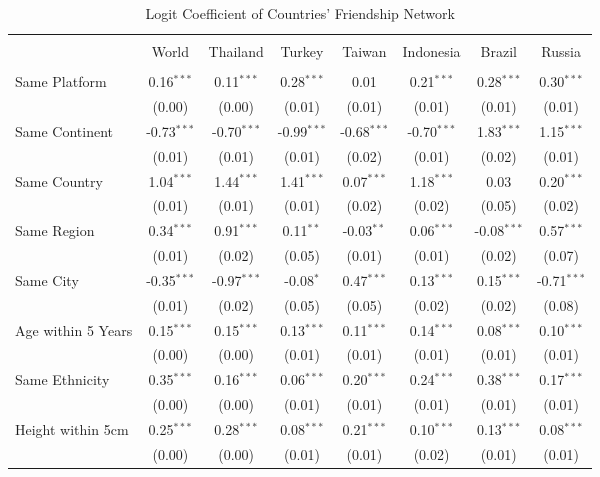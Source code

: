 \begin{table}[!htbp] \centering
  \caption{Logit Coefficient of Countries' Friendship Network}
\begin{tabular}{lccccccc}
\\[-1.8ex]\hline \hline
\\[-1.8ex] & World & Thailand & Turkey & Taiwan & Indonesia & Brazil & Russia   \\
\hline \\[-1.8ex]
 Same Platform & 0.16$^{***}$ & 0.11$^{***}$ & 0.28$^{***}$ & 0.01 & 0.21$^{***}$ & 0.28$^{***}$ & 0.30$^{***}$ \\
    & (0.00) & (0.00) & (0.01) & (0.01) & (0.01) & (0.01) & (0.01) \\
    Same Continent & -0.73$^{***}$ & -0.70$^{***}$ & -0.99$^{***}$ & -0.68$^{***}$ & -0.70$^{***}$ & 1.83$^{***}$ & 1.15$^{***}$ \\
    & (0.01) & (0.01) & (0.01) & (0.02) & (0.01) & (0.02) & (0.01) \\
    Same Country & 1.04$^{***}$ & 1.44$^{***}$ & 1.41$^{***}$ & 0.07$^{***}$ & 1.18$^{***}$ & 0.03 & 0.20$^{***}$ \\
    & (0.01) & (0.01) & (0.01) & (0.02) & (0.02) & (0.05) & (0.02) \\
    Same Region & 0.34$^{***}$ & 0.91$^{***}$ & 0.11$^{**}$ & -0.03$^{**}$ & 0.06$^{***}$ & -0.08$^{***}$ & 0.57$^{***}$ \\
    & (0.01) & (0.02) & (0.05) & (0.01) & (0.01) & (0.02) & (0.07) \\
    Same City & -0.35$^{***}$ & -0.97$^{***}$ & -0.08$^{*}$ & 0.47$^{***}$ & 0.13$^{***}$ & 0.15$^{***}$ & -0.71$^{***}$ \\
    & (0.01) & (0.02) & (0.05) & (0.05) & (0.02) & (0.02) & (0.08) \\
    Age within 5 Years & 0.15$^{***}$ & 0.15$^{***}$ & 0.13$^{***}$ & 0.11$^{***}$ & 0.14$^{***}$ & 0.08$^{***}$ & 0.10$^{***}$ \\
    & (0.00) & (0.00) & (0.01) & (0.01) & (0.01) & (0.01) & (0.01) \\
    Same Ethnicity & 0.35$^{***}$ & 0.16$^{***}$ & 0.06$^{***}$ & 0.20$^{***}$ & 0.24$^{***}$ & 0.38$^{***}$ & 0.17$^{***}$ \\
    & (0.00) & (0.00) & (0.01) & (0.01) & (0.01) & (0.01) & (0.01) \\
    Height within 5cm & 0.25$^{***}$ & 0.28$^{***}$ & 0.08$^{***}$ & 0.21$^{***}$ & 0.10$^{***}$ & 0.13$^{***}$ & 0.08$^{***}$ \\
    & (0.00) & (0.00) & (0.01) & (0.01) & (0.02) & (0.01) & (0.01) \\

\end{tabular}
\end{table}
